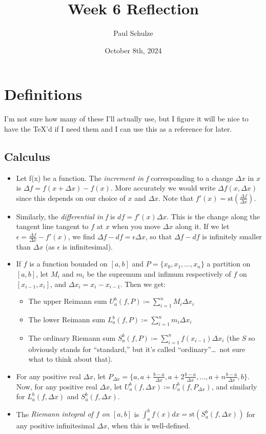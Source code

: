 \documentclass{article}
\title{Week 6 Reflection}
\author{Paul Schulze}
\date{October 8th, 2024}
\newcommand{\st}[1]{\mathrm{st}(#1)}
\begin{document}
\maketitle

\section*{Definitions}
I'm not sure how many of these I'll actually use, but I figure it will be nice to have the TeX'd if I need them and I can use this as a reference for later.
\subsection*{Calculus}
\begin{itemize}
    \item Let f(x) be a function. The \textit{increment in f} corresponding to a change $\Delta x$ in $x$ is $\Delta f = f(x + \Delta x) - f(x)$. More accurately we would write $\Delta f(x, \Delta x)$ since this depends on our choice of $x$ and $\Delta x$. Note that $f'(x) = \st{\frac{\Delta f}{\Delta x}}$.
    \item Similarly, the \textit{differential in f} is $df = f'(x)\Delta x$. This is the change along the tangent line tangent to $f$ at $x$ when you move $\Delta x$ along it. If we let $\epsilon = \frac{\Delta f}{\Delta x} - f'(x)$, we find $\Delta f - df = \epsilon\Delta x$, so that $\Delta f - df$ is infinitely smaller than $\Delta x$ (as $\epsilon$ is infinitesimal).
    \item If $f$ is a function bounded on $[a, b]$ and $P = \{x_0, x_1, \ldots, x_n\}$ a partition on $[a, b]$, let $M_i$ and $m_i$ be the supremum and infimum respectively of $f$ on $[x_{i-1}, x_i]$, and $\Delta x_i = x_i - x_{i-1}$. Then we get:
    \begin{itemize}
        \item The upper Reimann sum $U_a^b(f, P) \coloneq \sum_{i=1}^n M_i\Delta x_i$
        \item The lower Reimann sum $L_a^b(f, P) \coloneq \sum_{i=1}^n m_i\Delta x_i$
        \item The ordinary Riemann sum $S_a^b(f, P) \coloneq \sum_{i=1}^n f(x_{i-1})\Delta x_i$ (the $S$ so obviously stands for ``standard,'' but it's called ``ordinary''\dots\ not sure what to think about that).
    \end{itemize}
    \item For any positive real $\Delta x$, let $P_{\Delta x} = \{a, a+\frac{b-a}{\Delta x}, a + 2\frac{b-a}{\Delta x}, \ldots, a + n\frac{b-a}{\Delta x}, b\}$. Now, for any positive real $\Delta x$, let $U_a^b(f, \Delta x) \coloneq U_a^b(f, P_{\Delta x})$, and similarly for $L_a^b(f, \Delta x)$ and $S_a^b(f, \Delta x)$.
    \item The \textit{Riemann integral of $f$ on $[a, b]$} is $\int_a^b f(x)dx = \st{S_a^b(f, \Delta x)}$ for any positive infinitesimal $\Delta x$, when this is well-defined. 
\end{itemize}
\end{document}
